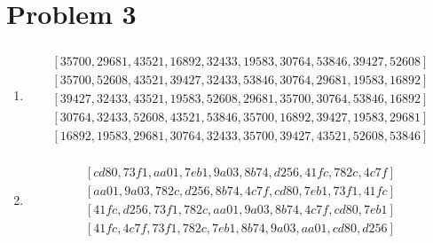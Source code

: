 \documentclass[12pt,a4paper]{article}
\begin{document}

\newpage
\section*{Problem 3}

\begin{enumerate}
	\item 
	\begin{align*}
		[29681, 53846, 43521, 39427, 32433, 35700, 30764, 16892, 52608, 19583] \\
		[35700, 29681, 43521, 16892, 32433, 19583, 30764, 53846, 39427, 52608] \\
		[35700, 52608, 43521, 39427, 32433, 53846, 30764, 29681, 19583, 16892] \\
		[39427, 32433, 43521, 19583, 52608, 29681, 35700, 30764, 53846, 16892] \\
		[30764, 32433, 52608, 43521, 53846, 35700, 16892, 39427, 19583, 29681] \\
		[16892, 19583, 29681, 30764, 32433, 35700, 39427, 43521, 52608, 53846]
	\end{align*}

	\item 
	\begin{align*}
		[8b74, 73f1, aa01, 41fc, 7eb1, 4c7f, 782c, d256, 9a03, cd80] \\
		[cd80, 73f1, aa01, 7eb1, 9a03, 8b74, d256, 41fc, 782c, 4c7f] \\
		[aa01, 9a03, 782c, d256, 8b74, 4c7f, cd80, 7eb1, 73f1, 41fc] \\
		[41fc, d256, 73f1, 782c, aa01, 9a03, 8b74, 4c7f, cd80, 7eb1] \\
		[41fc, 4c7f, 73f1, 782c, 7eb1, 8b74, 9a03, aa01, cd80, d256] \\
	\end{align*}
\end{enumerate}
\end{document}
